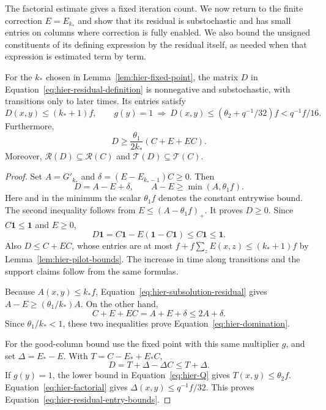 The factorial estimate gives a fixed iteration count.  We now return to
the finite correction $E=E_{k_*}$ and show that its residual is
substochastic and has small entries on columns where correction is fully
enabled.  We also bound the unsigned constituents of its defining
expression by the residual itself, as needed when that expression is
estimated term by term.

\begin{lemma}
\label{lem:hier-residual}
For the $k_*$ chosen in Lemma~\ref{lem:hier-fixed-point}, the matrix
$D$ in Equation~\eqref{eq:hier-residual-definition} is
nonnegative and substochastic, with transitions only to later times.  Its entries satisfy
\begin{equation}
 D(x,y)\leq(k_*+1)f,
 \qquad
 g(y)=1\ \Longrightarrow\
 D(x,y)\leq(\theta_2+q^{-1}/32)f<q^{-1}f/16.
 \label{eq:hier-residual-entry-bounds}
\end{equation}
Furthermore,
\begin{equation}
 D\geq\frac{\theta_1}{2k_*}(C+E+EC).
 \label{eq:hier-domination}
\end{equation}
Moreover,
$\mathcal R(D)\subseteq\mathcal R(C)$ and
$\mathcal T(D)\subseteq\mathcal T(C)$.
\end{lemma}

\begin{proof}
Set $A=G'_{k_*}$ and
$\delta=(E-E_{k_*-1})C\geq0$.  Then
\begin{equation}
 D=A-E+\delta,
 \qquad A-E\geq\min(A,\theta_1f).
 \label{eq:hier-subsolution-residual}
\end{equation}
Here and in the minimum the scalar $\theta_1f$ denotes the constant
entrywise bound.  The second inequality follows from
$E\leq(A-\theta_1f)_+$.  It proves $D\geq0$.
Since $C\mathbf 1\leq\mathbf 1$ and $E\geq0$,
\[
 D\mathbf 1=C\mathbf 1-E(\mathbf 1-C\mathbf 1)
       \leq C\mathbf 1\leq\mathbf 1.
\]
Also $D\leq C+EC$, whose entries are at most
$f+f\sum_z E(x,z)\leq(k_*+1)f$ by
Lemma~\ref{lem:hier-pilot-bounds}.  The increase in time along transitions and the support
claims follow from the same formulas.

Because $A(x,y)\leq k_*f$, Equation~\eqref{eq:hier-subsolution-residual}
gives $A-E\geq(\theta_1/k_*)A$.  On the other hand,
\[
 C+E+EC=A+E+\delta\leq2A+\delta.
\]
Since $\theta_1/k_*<1$, these two inequalities prove
Equation~\eqref{eq:hier-domination}.

For the good-column bound use the fixed point with this same multiplier
$g$, and set $\Delta=E_*-E$.  With $T=C-E_*+E_*C$,
\[
 D=T+\Delta-\Delta C\leq T+\Delta.
\]
If $g(y)=1$, the lower bound in Equation~\eqref{eq:hier-Q} gives
$T(x,y)\leq\theta_2f$.  Equation~\eqref{eq:hier-factorial} gives
$\Delta(x,y)\leq q^{-1}f/32$.  This proves
Equation~\eqref{eq:hier-residual-entry-bounds}.
\end{proof}


